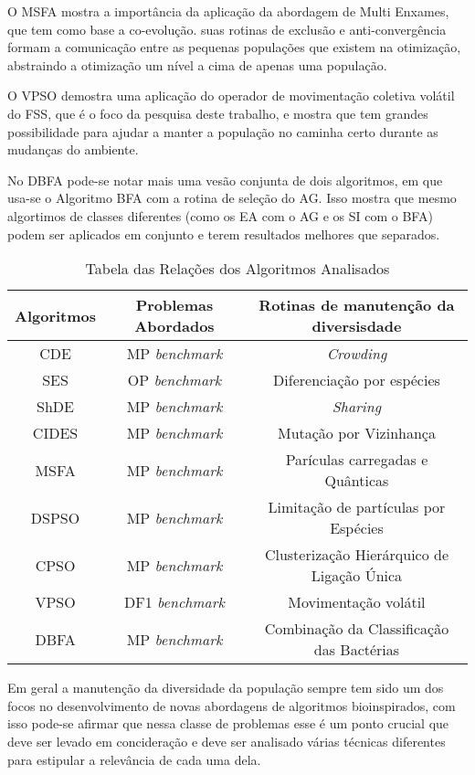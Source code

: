 O MSFA mostra a importância da aplicação da abordagem de Multi Enxames, que tem como base a co-evolução. suas rotinas de exclusão e anti-convergência formam a comunicação entre as pequenas populações que existem na otimização, abstraindo a otimização um nível a cima de apenas uma população.

O VPSO demostra uma aplicação do operador de movimentação coletiva volátil do FSS, que é o foco da pesquisa deste trabalho, e mostra que tem grandes possibilidade para ajudar a manter a população no caminha certo durante as mudanças do ambiente.

No DBFA pode-se notar mais uma vesão conjunta de dois algoritmos, em que usa-se o Algoritmo BFA com a rotina de seleção do AG. Isso mostra que mesmo algortimos de classes diferentes (como os EA com o AG e os SI com o BFA) podem ser aplicados em conjunto e terem resultados melhores que separados.

\begin{table}[]
	\label{tab:problems_table}
	\centering
	\caption{Tabela das Relações dos Algoritmos Analisados}
	\label{my-label}
	\begin{tabular}{|c|c|c|}
		\hline
		Algoritmos & Problemas Abordados & Rotinas de manutenção da diversisdade \\ \hline
		CDE        & MP \textit{benchmark}   & \textit{Crowding} \\ \hline
		SES        & OP \textit{benchmark}   & Diferenciação por espécies \\ \hline
		ShDE       & MP \textit{benchmark}   & \textit{Sharing} \\ \hline
		CIDES      & MP \textit{benchmark}   & Mutação por Vizinhança \\ \hline
		MSFA       & MP \textit{benchmark}   & Parículas carregadas e Quânticas \\ \hline
		DSPSO      & MP \textit{benchmark}   & Limitação de partículas por Espécies \\ \hline
		CPSO       & MP \textit{benchmark}   & Clusterização Hierárquico de Ligação Única \\ \hline
		VPSO       & DF1 \textit{benchmark}  & Movimentação volátil \\ \hline
		DBFA       & MP \textit{benchmark}   & Combinação da Classificação das Bactérias \\ \hline
	\end{tabular}
\end{table}

Em geral a manutenção da diversidade da população sempre tem sido um dos focos no desenvolvimento de novas abordagens de algoritmos bioinspirados, com isso pode-se afirmar que nessa classe de problemas esse é um ponto crucial que deve ser levado em concideração e deve ser analisado várias técnicas diferentes para estipular a relevância de cada uma dela.
